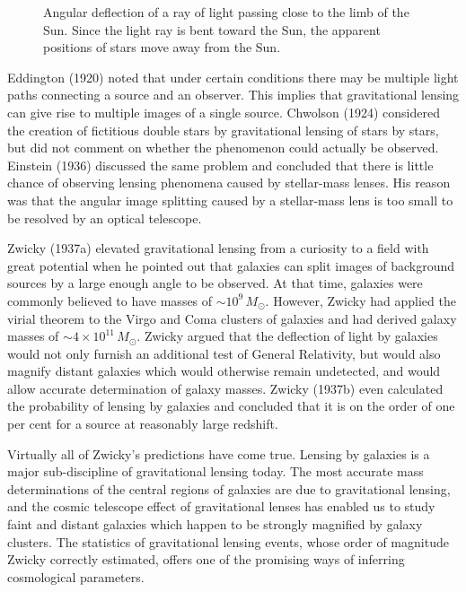 \documentclass[a4paper,10pt]{article} %
\begin{document}
\begin{figure}[ht] %
\begin{center}
\begin{minipage}[t]{0.9\hsize}
\end{minipage}
\end{center}
\caption{Angular deflection of a ray of light passing close to the
  limb of the Sun. Since the light ray is bent toward the Sun, the
  apparent positions of stars move away from the Sun.}
\label{NB:fig101}
\end{figure}

Eddington (1920) noted that under certain conditions there may be
multiple light paths connecting a source and an observer. This implies
that gravitational lensing can give rise to multiple images of a
single source. Chwolson (1924) considered the creation of fictitious
double stars by gravitational lensing of stars by stars, but did not
comment on whether the phenomenon could actually be observed.
Einstein (1936) discussed the same problem and concluded that there is
little chance of observing lensing phenomena caused by stellar-mass
lenses. His reason was that the angular image splitting caused by a
stellar-mass lens is too small to be resolved by an optical telescope.

Zwicky (1937a) elevated gravitational lensing from a curiosity to a
field with great potential when he pointed out that galaxies can split
images of background sources by a large enough angle to be
observed. At that time, galaxies were commonly believed to have masses
of $\sim10^9\,M_\odot$. However, Zwicky had applied the virial theorem
to the Virgo and Coma clusters of galaxies and had derived galaxy
masses of $\sim4\times10^{11}\,M_\odot$. Zwicky argued that the
deflection of light by galaxies would not only furnish an additional
test of General Relativity, but would also magnify distant galaxies
which would otherwise remain undetected, and would allow accurate
determination of galaxy masses. Zwicky (1937b) even calculated the
probability of lensing by galaxies and concluded that it is on the
order of one per cent for a source at reasonably large redshift.

Virtually all of Zwicky's predictions have come true. Lensing by
galaxies is a major sub-discipline of gravitational lensing today. The
most accurate mass determinations of the central regions of galaxies
are due to gravitational lensing, and the cosmic telescope effect of
gravitational lenses has enabled us to study faint and distant
galaxies which happen to be strongly magnified by galaxy clusters. The
statistics of gravitational lensing events, whose order of magnitude
Zwicky correctly estimated, offers one of the promising ways of
inferring cosmological parameters.
\end{document}
